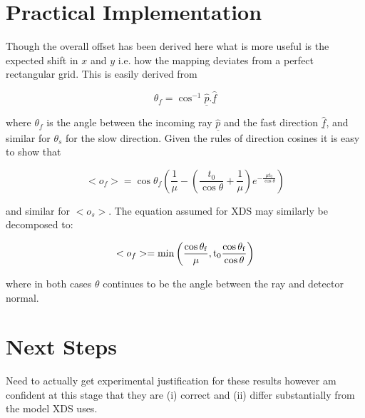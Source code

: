 \documentclass{article}
\begin{document}
\section{Practical Implementation}

Though the overall offset has been derived here what is more useful is
the expected shift in $x$ and $y$ i.e. how the mapping deviates from a
perfect rectangular grid. This is easily derived from 

\begin{equation}
\theta_f = \cos^{-1} \underline{\hat{p}}.\underline{\hat{f}}
\end{equation}

\noindent
where $\theta_f$ is the angle between the incoming ray
$\underline{\hat{p}}$ and the fast direction $\underline{\hat{f}}$,
and similar for $\theta_s$ for the slow direction. Given the rules of
direction cosines it is easy to show that

\begin{equation}
<o_f> = \cos \theta_f \left( \frac{1}{\mu} - \left( \frac{t_0}{\cos
      \theta} + \frac{1}{\mu} \right) e^{- \frac{\mu t_0}{\cos \theta}} \right)
\end{equation}

\noindent 
and similar for $<o_s>$. The equation assumed for XDS may similarly be
decomposed to:

\begin{equation}
<o_f> = \rm{min}\left(\frac{\cos \theta_f}{\mu}, t_0 \frac{\cos
    \theta_f}{\cos \theta} \right)
\end{equation}

\noindent
where in both cases $\theta$ continues to be the angle between the ray
and detector normal.

\section{Next Steps}

Need to actually get experimental justification for these results
however am confident at this stage that they are (i) correct and (ii)
differ substantially from the model XDS uses.
\end{document}
